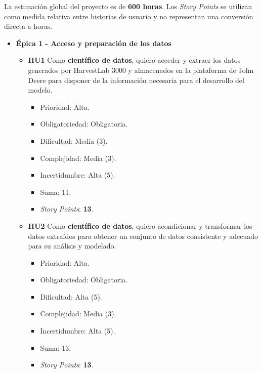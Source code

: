\documentclass[
11pt, %
]{charter}
\begin{document}
La estimación global del proyecto es de \textbf{600 horas}. Los \textit{Story Points} se utilizan como medida relativa entre historias de usuario y no representan una conversión directa a horas.

\begin{itemize}

  \item \textbf{\'{E}pica 1 - Acceso y preparación de los datos}
    \begin{itemize}

      \item \textbf{HU1} Como \textbf{científico de datos}, quiero acceder y extraer los datos generados por HarvestLab 3000 y almacenados en la plataforma de John Deere para disponer de la información necesaria para el desarrollo del modelo.
        \begin{itemize}
          \item Prioridad: Alta.
          \item Obligatoriedad: Obligatoria.
          \item Dificultad: Media (3).
          \item Complejidad: Media (3).
          \item Incertidumbre: Alta (5).
          \item Suma: 11.
          \item \textit{Story Points}: \textbf{13}.
        \end{itemize}

      \item \textbf{HU2} Como \textbf{científico de datos}, quiero acondicionar y transformar los datos extraídos para obtener un conjunto de datos consistente y adecuado para su análisis y modelado.
        \begin{itemize}
          \item Prioridad: Alta.
          \item Obligatoriedad: Obligatoria.
          \item Dificultad: Alta (5).
          \item Complejidad: Media (3).
          \item Incertidumbre: Alta (5).
          \item Suma: 13.
          \item \textit{Story Points}: \textbf{13}.
        \end{itemize}

    \end{itemize}



\end{itemize}
\end{document}
